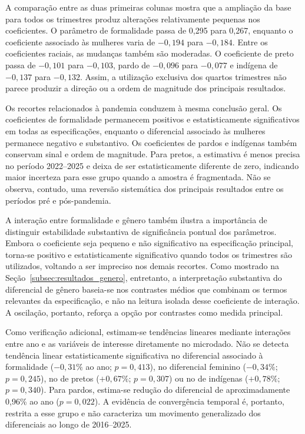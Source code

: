 \documentclass[12pt,a4paper]{article}
\begin{document}
A comparação entre as duas primeiras colunas mostra que a ampliação da base
para todos os trimestres produz alterações relativamente pequenas nos
coeficientes. O parâmetro de formalidade passa de 0,295 para 0,267, enquanto
o coeficiente associado às mulheres varia de $-0,194$ para $-0,184$. Entre os
coeficientes raciais, as mudanças também são moderadas. O coeficiente de preto passa de
$-0,101$ para $-0,103$, pardo de $-0,096$ para $-0,077$ e indígena de
$-0,137$ para $-0,132$. Assim, a utilização exclusiva dos quartos trimestres
não parece produzir a direção ou a ordem de magnitude dos principais
resultados.

Os recortes relacionados à pandemia conduzem à mesma conclusão geral. Os
coeficientes de formalidade permanecem positivos e estatisticamente
significativos em todas as especificações, enquanto o diferencial associado
às mulheres permanece negativo e substantivo. Os coeficientes de pardos e
indígenas também conservam sinal e ordem de magnitude. Para pretos, a
estimativa é menos precisa no período 2022--2025 e deixa de ser
estatisticamente diferente de zero, indicando maior incerteza para esse grupo
quando a amostra é fragmentada. Não se observa, contudo, uma reversão
sistemática dos principais resultados entre os períodos pré e pós-pandemia.

A interação entre formalidade e gênero também ilustra a importância de
distinguir estabilidade substantiva de significância pontual dos parâmetros.
Embora o coeficiente seja pequeno e não significativo na especificação
principal, torna-se positivo e estatisticamente significativo quando todos os
trimestres são utilizados, voltando a ser impreciso nos demais recortes.
Como mostrado na Seção~\ref{subsec:resultados_genero}, entretanto, a
interpretação substantiva do diferencial de gênero baseia-se nos contrastes
médios que combinam os termos relevantes da especificação, e não na leitura
isolada desse coeficiente de interação. A oscilação, portanto, reforça a opção
por contrastes como medida principal.

Como verificação adicional, estimam-se tendências lineares mediante interações
entre ano e as variáveis de interesse diretamente no microdado. Não se detecta
tendência linear estatisticamente significativa no diferencial associado à
formalidade ($-0,31\%$ ao ano; $p=0,413$), no diferencial feminino
($-0,34\%$; $p=0,245$), no de pretos ($+0,67\%$; $p=0,307$) ou no de
indígenas ($+0,78\%$; $p=0,340$). Para pardos, estima-se redução do
diferencial de aproximadamente 0,96\% ao ano ($p=0,022$). A evidência de
convergência temporal é, portanto, restrita a esse grupo e não caracteriza um
movimento generalizado dos diferenciais ao longo de 2016--2025.
\end{document}
